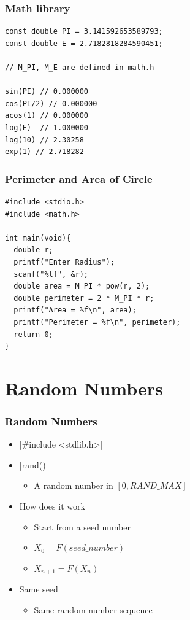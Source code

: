 \documentclass{../c-lecture}
\begin{document}
\begin{frame}[fragile]
  \frametitle{Math library}
  \begin{verbatim}
const double PI = 3.141592653589793;
const double E = 2.7182818284590451;

// M_PI, M_E are defined in math.h

sin(PI) // 0.000000
cos(PI/2) // 0.000000
acos(1) // 0.000000
log(E)  // 1.000000
log(10) // 2.30258
exp(1) // 2.718282
  \end{verbatim}
\end{frame}

\begin{frame}[fragile]
  \frametitle{Perimeter and Area of Circle}
  \begin{verbatim}
#include <stdio.h>
#include <math.h>

int main(void){
  double r;
  printf("Enter Radius");
  scanf("%lf", &r);
  double area = M_PI * pow(r, 2);
  double perimeter = 2 * M_PI * r;
  printf("Area = %f\n", area);
  printf("Perimeter = %f\n", perimeter);
  return 0;
}
  \end{verbatim}
\end{frame}

\section{Random Numbers}

\begin{frame}[fragile]
  \frametitle{Random Numbers}
  \begin{itemize}
    \item {}|#include <stdlib.h>|
    \item {}|rand()|
    \begin{itemize}
      \item A random number in $[0, RAND\_MAX]$
    \end{itemize}
    \item How does it work
    \begin{itemize}
      \item Start from a {\color{Orange} seed} number
      \item $X_0 = F(seed\_number)$
      \item $X_{n + 1} = F(X_n)$
    \end{itemize}
    \item Same seed
    \begin{itemize}
      \item Same random number sequence
    \end{itemize}
  \end{itemize}
\end{frame}
\end{document}
